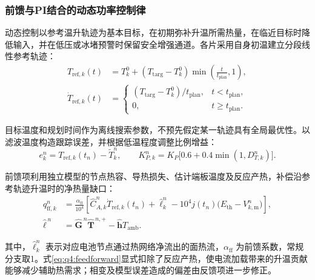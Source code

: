 \documentclass[bwprint]{gmcmthesis}
\numberwithin{figure}{section}
\begin{document}
\subsubsection{前馈与PI结合的动态功率控制律}

动态控制以参考温升轨迹为基本目标，在初期弥补升温所需热量，在临近目标时降低输入，并在低压或冰堵预警时保留安全增强通道。各片采用自身初温建立分段线性参考轨迹：
\begin{equation}
\begin{aligned}
T_{\mathrm{ref},k}(t)&=T_k^0+
(T_{\mathrm{targ}}-T_k^0)\min\!\left(\frac{t}{t_{\mathrm{plan}}},1\right),
\\
\dot T_{\mathrm{ref},k}(t)&=\begin{cases}
(T_{\mathrm{targ}}-T_k^0)/t_{\mathrm{plan}}, & t<t_{\mathrm{plan}},\\
0, & t\geq t_{\mathrm{plan}}.
\end{cases}
\end{aligned}
\tag{7-18}\label{eq:q4:temperature_reference}
\end{equation}

目标温度和规划时间作为离线搜索参数，不预先假定某一轨迹具有全局最优性。以滤波温度构造跟踪误差，并根据低温程度调整比例增益：
\begin{equation}
e_k^n=T_{\mathrm{ref},k}(t_n)-\widetilde T_k^n,
\qquad
K_{P,k}^n=K_P\big[0.6+0.4\min(1,D_{T,k}^n)\big].
\tag{7-19}\label{eq:q4:tracking_error_gain}
\end{equation}

前馈项利用独立模型的节点热容、导热损失、估计端板温度及反应产热，补偿沿参考轨迹升温时的净热量缺口：
\begin{equation}
\begin{aligned}
q_{\mathrm{ff},k}^n
&=\frac{\alpha_{\mathrm{ff}}}{10^4}
\left[\widehat C_{A,k}^n\dot T_{\mathrm{ref},k}(t_n)
+\widehat\ell_k^n-10^4j(t_n)\big(E_{\mathrm{th}}-V_{k,\mathrm m}^n\big)\right],
\\
\widehat{\boldsymbol\ell}^{\,n}
&=\widehat{\boldsymbol G}^{\,n}\widehat{\boldsymbol T}^{\,n,+}
-\widehat{\boldsymbol h}T_{\mathrm{amb}}.
\end{aligned}
\tag{7-20}\label{eq:q4:feedforward}
\end{equation}

其中，$\widehat\ell_k^n$ 表示对应电池节点通过热网络净流出的面热流，$\alpha_{\mathrm{ff}}$ 为前馈系数，常规分支取1。式\eqref{eq:q4:feedforward}显式扣除了反应产热，使电流加载带来的升温贡献能够减少辅助热需求；相变及模型误差造成的偏差由反馈项进一步修正。
\end{document}
